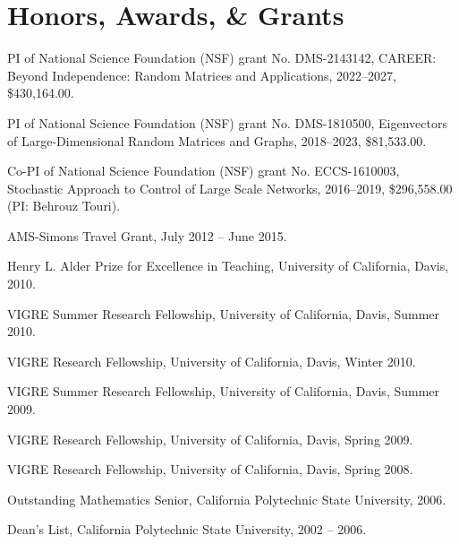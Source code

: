 \documentclass[letterpaper]{article}
\renewenvironment{itemize}{
  \begin{list}{}{
    \setlength{\leftmargin}{1em}
  }
}{
  \end{list}
}
\begin{document}
\section*{Honors, Awards, \& Grants}
\begin{itemize}
	\item PI of National Science Foundation (NSF) grant No. DMS-2143142, CAREER: Beyond Independence: Random Matrices and Applications, 2022--2027, \$430,164.00.  
	\item PI of National Science Foundation (NSF) grant No. DMS-1810500, Eigenvectors of Large-Dimensional Random Matrices and Graphs, 2018--2023, \$81,533.00.  
	\item Co-PI of National Science Foundation (NSF) grant No. ECCS-1610003, Stochastic Approach to Control of Large Scale Networks, 2016--2019, \$296,558.00 (PI: Behrouz Touri).  
	\item AMS-Simons Travel Grant, July 2012 -- June 2015.
	\item Henry L. Alder Prize for Excellence in Teaching, University of California, Davis, 2010.
	\item VIGRE Summer Research Fellowship, University of California, Davis, Summer 2010.
	\item VIGRE Research Fellowship, University of California, Davis, Winter 2010.
	\item VIGRE Summer Research Fellowship, University of California, Davis, Summer 2009.
	\item VIGRE Research Fellowship, University of California, Davis, Spring 2009.
	\item VIGRE Research Fellowship, University of California, Davis, Spring 2008.
	\item Outstanding Mathematics Senior, California Polytechnic State University, 2006.
	\item Dean's List, California Polytechnic State University, 2002 -- 2006.
\end{itemize}
\end{document}
